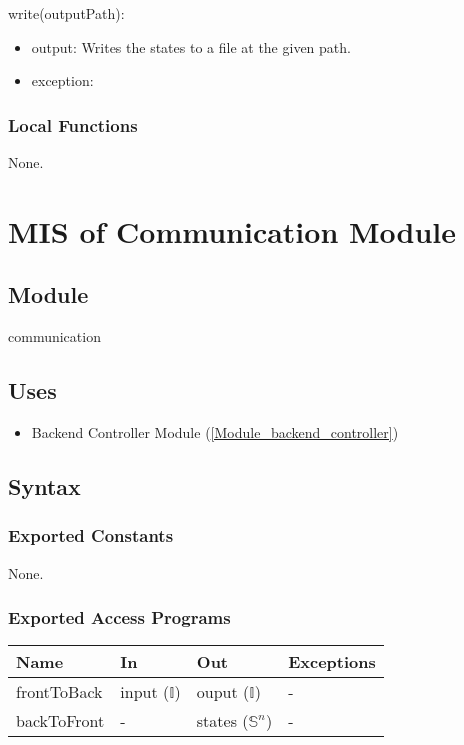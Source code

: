 \documentclass[12pt, titlepage]{article}
\begin{document}
\noindent write(outputPath):
\begin{itemize}
\item output: Writes the states to a file at the given path.
\item exception:  
\end{itemize}

\subsubsection{Local Functions}

None.

\newpage

\section{MIS of Communication Module} \label{Module_communication}

\subsection{Module}

communication

\subsection{Uses}

\begin{itemize}
  \item Backend Controller Module (\ref{Module_backend_controller})
\end{itemize}

\subsection{Syntax}

\subsubsection{Exported Constants}
None.

\subsubsection{Exported Access Programs}

\begin{center}
\begin{tabular}{p{2cm} p{4cm} p{4cm} p{2cm}}
\hline
\textbf{Name} & \textbf{In} & \textbf{Out} & \textbf{Exceptions} \\
\hline
frontToBack & input ($\mathbb{I}$) & ouput ($\mathbb{I}$) & - \\
backToFront & - & states ($\mathbb{S}^n$) & - \\
\hline
\end{tabular}
\end{center}
\end{document}

